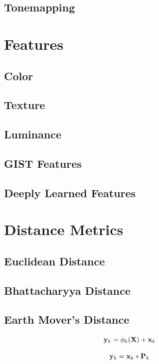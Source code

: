 \subsection{Tonemapping}
\section{Features}
\subsection{Color}
\subsection{Texture}
\subsection{Luminance}
\subsection{GIST Features}
\subsection{Deeply Learned Features}
\section{Distance Metrics}
\subsection{Euclidean Distance}
\subsection{Bhattacharyya Distance}
\subsection{Earth Mover’s Distance}

\begin{equation}
{\bf y}_k = \phi_k ( {\bf X}) + {\bf x}_k 
\label{eq:prn}
\end{equation}


\begin{equation}
{\bf y}_k = {\bf x}_k * {\bf P}_k
\end{equation}


